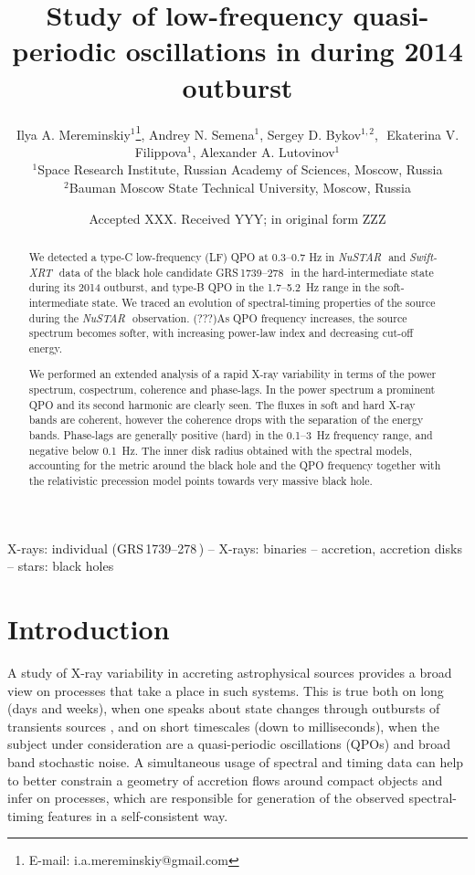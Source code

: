 \documentclass[a4paper,fleqn,usenatbib]{mnras}
\title[Low-frequency QPOs in  \grs]{Study of low-frequency quasi-periodic oscillations in \grs during 2014 outburst}
\author[I. A. Mereminskiy et al.]{
Ilya A. Mereminskiy$^{1}$\thanks{E-mail: i.a.mereminskiy@gmail.com},
Andrey N. Semena$^{1}$,
Sergey D. Bykov$^{1,2}$, \newauthor
\,\,Ekaterina V. Filippova$^{1}$,
Alexander A. Lutovinov$^{1}$
\\
$^{1}$Space Research Institute, Russian Academy of Sciences, Moscow, Russia\\
$^{2}$Bauman Moscow State Technical University, Moscow, Russia\\
}
\date{Accepted XXX. Received YYY; in original form ZZZ}
\def\grs{{GRS\,1739--278\,}}
\def\swiftx{{\em Swift-XRT\,}}
\def\nustar{{\em NuSTAR\,}}
\begin{document}
\label{firstpage}
\pagerange{\pageref{firstpage}--\pageref{lastpage}}
\maketitle

\begin{abstract}
We detected a type-C low-frequency (LF) QPO at 0.3--0.7 Hz in \nustar\, and \swiftx\, data of the black hole candidate \grs\, in the hard-intermediate state during its 2014 outburst, and type-B QPO in the 1.7--5.2~Hz range in the soft-intermediate state. We traced an evolution of spectral-timing properties of the source during the \nustar\, observation. 
(???)As QPO frequency increases, the source spectrum becomes softer, with increasing power-law index and decreasing cut-off energy.

We performed an extended analysis of a rapid X-ray variability in terms of the power spectrum, cospectrum, coherence and phase-lags. 
In the power spectrum a prominent QPO and its second harmonic are clearly seen. 
The fluxes in soft and hard X-ray bands are coherent, however the coherence drops with the separation of the energy bands. 
Phase-lags are generally positive (hard) in the 0.1--3~Hz frequency range, and negative below 0.1~Hz.
The inner disk radius obtained with the spectral models, accounting for the metric around the black hole and the QPO frequency together with the relativistic precession model points towards very massive black hole.
\end{abstract}

\begin{keywords}
X-rays: individual (\grs) -- X-rays: binaries -- accretion, accretion disks  -- stars: black holes
\end{keywords}


\section{Introduction}
\label{sec:intro} 
A study of X-ray variability in accreting astrophysical sources provides a broad view on processes that take a place in such systems. 
This is true both on long (days and weeks), when one speaks about state changes through outbursts of transients sources \citep[see e.g.][]{homan05, heil15}, and on short timescales (down to milliseconds), when the subject under consideration are a quasi-periodic oscillations (QPOs) and broad band stochastic noise. 
A simultaneous usage of spectral and timing data can help to better constrain a geometry of accretion flows around compact objects and infer on processes, which are responsible for generation of the observed spectral-timing features in a self-consistent way.
\end{document}
